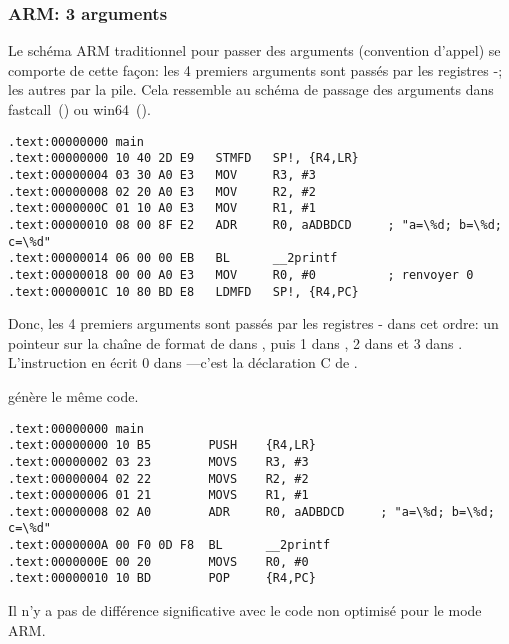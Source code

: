 \subsubsection{ARM: 3 arguments}

Le schéma ARM traditionnel pour passer des arguments (convention d'appel) se
comporte de cette façon:
les 4 premiers arguments sont passés par les registres -; les autres
par la pile.
Cela ressemble au schéma de passage des arguments dans
fastcall~() ou win64~().


\mysubparagraph{\NonOptimizingKeilVI (\ARMMode)}

\begin{lstlisting}[caption=\NonOptimizingKeilVI (\ARMMode),style=customasmARM]
.text:00000000 main
.text:00000000 10 40 2D E9   STMFD   SP!, {R4,LR}
.text:00000004 03 30 A0 E3   MOV     R3, #3
.text:00000008 02 20 A0 E3   MOV     R2, #2
.text:0000000C 01 10 A0 E3   MOV     R1, #1
.text:00000010 08 00 8F E2   ADR     R0, aADBDCD     ; "a=\%d; b=\%d; c=\%d"
.text:00000014 06 00 00 EB   BL      __2printf
.text:00000018 00 00 A0 E3   MOV     R0, #0          ; renvoyer 0
.text:0000001C 10 80 BD E8   LDMFD   SP!, {R4,PC}
\end{lstlisting}

Donc, les 4 premiers arguments sont passés par les registres - dans
cet ordre:
un pointeur sur la chaîne de format de \printf dans , puis 1 dans ,
2 dans  et 3 dans .
L'instruction en  écrit 0 dans ---c'est la déclaration C
de .

\OptimizingKeilVI génère le même code.

\mysubparagraph{\OptimizingKeilVI (\ThumbMode)}

\begin{lstlisting}[caption=\OptimizingKeilVI (\ThumbMode),style=customasmARM]
.text:00000000 main
.text:00000000 10 B5        PUSH    {R4,LR}
.text:00000002 03 23        MOVS    R3, #3
.text:00000004 02 22        MOVS    R2, #2
.text:00000006 01 21        MOVS    R1, #1
.text:00000008 02 A0        ADR     R0, aADBDCD     ; "a=\%d; b=\%d; c=\%d"
.text:0000000A 00 F0 0D F8  BL      __2printf
.text:0000000E 00 20        MOVS    R0, #0
.text:00000010 10 BD        POP     {R4,PC}
\end{lstlisting}

Il n'y a pas de différence significative avec le code non optimisé pour le mode ARM.

